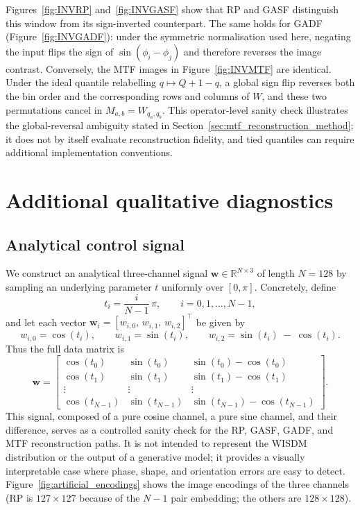 \documentclass[10pt,a4paper,parskip=half-]{scrartcl}
\begin{document}
Figures~\ref{fig:INVRP} and~\ref{fig:INVGASF} show that RP and GASF distinguish this window from its sign-inverted counterpart. The same holds for GADF (Figure~\ref{fig:INVGADF}): under the symmetric normalisation used here, negating the input flips the sign of $\sin(\phi_i-\phi_j)$ and therefore reverses the image contrast. Conversely, the MTF images in Figure~\ref{fig:INVMTF} are identical. Under the ideal quantile relabelling $q\mapsto Q{+}1{-}q$, a global sign flip reverses both the bin order and the corresponding rows and columns of $W$, and these two permutations cancel in $M_{a,b}=W_{q_a,q_b}$. This operator-level sanity check illustrates the global-reversal ambiguity stated in Section~\ref{sec:mtf_reconstruction_method}; it does not by itself evaluate reconstruction fidelity, and tied quantiles can require additional implementation conventions.

\section{Additional qualitative diagnostics}
\subsection{Analytical control signal}
We construct an analytical three-channel signal \( \mathbf{w} \in \mathbb{R}^{N \times 3} \) of length \(N=128\) by sampling an underlying parameter \(t\) uniformly over \([0,\pi]\). Concretely, define
\[
t_i = \frac{i}{N-1}\,\pi,\qquad i=0,1,\dots,N-1,
\]
and let each vector \(\mathbf{w}_i = [w_{i,0},\,w_{i,1},\,w_{i,2}]^\top\) be given by
\[
w_{i,0} = \cos(t_i),
\qquad
w_{i,1} = \sin(t_i),
\qquad
w_{i,2} = \sin(t_i)\;-\;\cos(t_i).
\]
Thus the full data matrix is
\[
\mathbf{w} =
\begin{bmatrix}
\cos(t_0) & \sin(t_0) & \sin(t_0)-\cos(t_0) \\
\cos(t_1) & \sin(t_1) & \sin(t_1)-\cos(t_1) \\
\vdots    & \vdots    & \vdots             \\
\cos(t_{N-1}) & \sin(t_{N-1}) & \sin(t_{N-1})-\cos(t_{N-1})
\end{bmatrix}.
\]
This signal, composed of a pure cosine channel, a pure sine channel, and their difference, serves as a controlled sanity check for the RP, GASF, GADF, and MTF reconstruction paths. It is not intended to represent the WISDM distribution or the output of a generative model; it provides a visually interpretable case where phase, shape, and orientation errors are easy to detect. Figure~\ref{fig:artificial_encodings} shows the image encodings of the three channels (RP is $127\times127$ because of the $N-1$ pair embedding; the others are $128\times128$).
\end{document}
